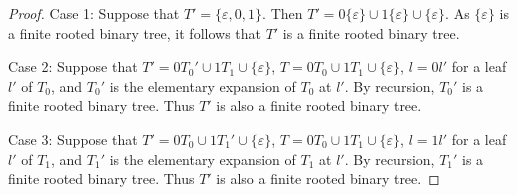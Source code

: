 \begin{proof}

 Case 1: Suppose that \(T'=\{\varepsilon,0,1\}\). 
 Then \(T'=0\{\varepsilon\} \cup 1\{\varepsilon\} \cup \{\varepsilon\}\). As \(\{\varepsilon\}\) is a finite rooted binary tree, it follows that \(T'\) is a finite rooted binary tree.

 Case 2: Suppose that \(T'= 0T_0'\cup 1 T_1 \cup \{\varepsilon\}\), \(T=0T_0 \cup 1T_1 \cup \{\varepsilon\}\), \(l=0l'\) for a leaf \(l'\) of \(T_0\), and \(T_0'\) is the elementary expansion of \(T_0\) at \(l'\). By recursion, \(T_0'\) is a finite rooted binary tree. Thus \(T'\) is also a finite rooted binary tree.
 
 Case 3: Suppose that \(T'= 0T_0\cup 1 T_1' \cup \{\varepsilon\}\), \(T=0T_0 \cup 1T_1 \cup \{\varepsilon\}\), \(l=1l'\) for a leaf \(l'\) of \(T_1\), and \(T_1'\) is the elementary expansion of \(T_1\) at \(l'\). By recursion, \(T_1'\) is a finite rooted binary tree. Thus \(T'\) is also a finite rooted binary tree.
 \end{proof}

